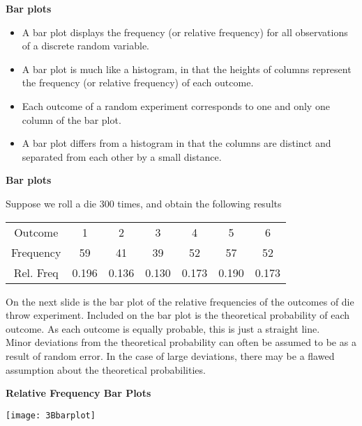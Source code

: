 \documentclass[]{report}
\begin{document}
	{
		\textbf{Bar plots}
		
		\begin{itemize} \item  A bar plot displays the frequency (or relative frequency) for all observations of a discrete random variable. \item  A bar plot is much like a histogram, in that the heights of columns represent the frequency (or relative frequency) of each outcome.
			\item  Each outcome of a random experiment corresponds to one and only one column of the bar plot.
			\item  A bar plot differs from a histogram in that the columns are distinct and separated from each other by a small distance.
		\end{itemize}
	}
	{
		\textbf{Bar plots}
		
		Suppose we roll a die 300 times, and obtain the following results
		
		\begin{center}
			\begin{tabular}{|c|c|c|c|c|c|c|}
				\hline
				
				Outcome & 1 & 2 & 3 & 4 & 5 & 6 \\
				Frequency & 59 &41 &39 &52 &57 &52  \\
				Rel. Freq & 0.196 & 0.136 & 0.130 & 0.173 & 0.190 & 0.173\\
				\hline
			\end{tabular}
		\end{center}
		
		On the next slide is the bar plot of the relative frequencies of the outcomes of die throw experiment.
		Included on the bar plot is the theoretical probability of each outcome. As each outcome is equally probable, this is just a straight line.\\ \bigskip
		Minor deviations from the theoretical probability can often be assumed to be as a result of random error. In the case of large deviations, there may be a flawed assumption about the theoretical probabilities.
	}
	
	
	{
		\textbf{Relative Frequency Bar Plots}
		
		\begin{center}
			\texttt{[image: 3Bbarplot]}
		\end{center}
	}
	
\end{document}

